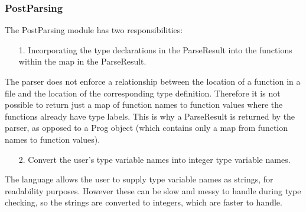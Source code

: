 \documentclass{article}
\begin{document}
\subsubsection{PostParsing}
The PostParsing module has two responsibilities:
\begin{enumerate}
    \item[1.] Incorporating the type declarations in the ParseResult into the functions within the map in the ParseResult.
\end{enumerate}
\indent The parser does not enforce a relationship between the location of a function in a file and the location of the corresponding type definition. Therefore it is not possible to return just a map of function names to function values where the functions already have type labels. This is why a ParseResult is returned by the parser, as opposed to a Prog object (which contains only a map from function names to function values).
\begin{enumerate}
    \item[2.] Convert the user's type variable names into integer type variable names.
\end{enumerate}
\indent The language allows the user to supply type variable names as strings, for readability purposes. However these can be slow and messy to handle during type checking, so the strings are converted to integers, which are faster to handle.
\end{document}
